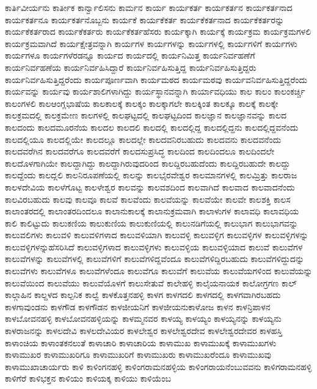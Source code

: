 {ಕಾರ್ತಿವೀರ್ಯನು
ಕಾರ್ತೀಕ
ಕಾರ್ನ್ವಾಲಿಸನು
ಕಾರ್ಮನ
ಕಾರ್ಯ
ಕಾರ್ಯಕರ್ತ
ಕಾರ್ಯಕರ್ತನ
ಕಾರ್ಯಕರ್ತನಾದ
ಕಾರ್ಯಕರ್ತನೂ
ಕಾರ್ಯಕರ್ತನೊಬ್ಬನು
ಕಾರ್ಯಕೆ
ಕಾರ್ಯಕೆಕರ್ತ
ಕಾರ್ಯಕೆಕರ್ತನಾದ
ಕಾರ್ಯಕೆಕರ್ತರನ್ನು
ಕಾರ್ಯಕೆಕರ್ತರಾದ
ಕಾರ್ಯಕೆಕರ್ತರು
ಕಾರ್ಯಕೆಕರ್ತಹೆಸರು
ಕಾರ್ಯಕ್ಕಾಗಿ
ಕಾರ್ಯಕ್ಕೆ
ಕಾರ್ಯಕ್ರಮ
ಕಾರ್ಯಕ್ರಮಗಳಲಿ
ಕಾರ್ಯಕ್ರಮವಾಗಿದೆ
ಕಾರ್ಯಕ್ಷೇತ್ರವನ್ನಾಗಿ
ಕಾರ್ಯಗಳ
ಕಾರ್ಯಗಳನ್ನು
ಕಾರ್ಯಗಳಲ್ಲಿ
ಕಾರ್ಯಗಳಿಗೆ
ಕಾರ್ಯಗಳು
ಕಾರ್ಯಗಳೂ
ಕಾರ್ಯಗಳೆರಡನ್ನೂ
ಕಾರ್ಯದ
ಕಾರ್ಯದಲ್ಲಿ
ಕಾರ್ಯನಿಮಿತ್ತ
ಕಾರ್ಯನಿರ್ವಹಣೆಗೆ
ಕಾರ್ಯನಿರ್ವಹಣೆಯ
ಕಾರ್ಯನಿರ್ವಹಿಸಿದ್ದಾರೆ
ಕಾರ್ಯನಿರ್ವಹಿಸುತ್ತಿದ್ದ
ಕಾರ್ಯನಿರ್ವಹಿಸುತ್ತಿದ್ದರು
ಕಾರ್ಯನಿರ್ವಹಿಸುತ್ತಿದ್ದರೆಂದು
ಕಾರ್ಯಪೂರ್ಣವಾಗಿ
ಕಾರ್ಯಮಠದ
ಕಾರ್ಯಮಠವು
ಕಾರ್ಯವನಿರ್ವಹಿಸುತ್ತಿದ್ದರೆಂದು
ಕಾರ್ಯವನ್ನು
ಕಾರ್ಯವು
ಕಾರ್ಯಶಾಲಿಗಳಾಗಿದ್ದು
ಕಾರ್ಯಸ್ಥಾನವನ್ನಾಗಿ
ಕಾರ್ಯಾವಧಿಯು
ಕಾಲ
ಕಾಲಂ
ಕಾಲಂಕರ್ಚ್ಚಿ
ಕಾಲಂಗಳಲಿ
ಕಾಲಆಂಗ್ಲಭಾಷೆಯ
ಕಾಲಕಾಲಕ್ಕೆ
ಕಾಲಕ್ಕಂ
ಕಾಲಕ್ಕಾಗಲೇ
ಕಾಲಕ್ಕಿಂತ
ಕಾಲಕ್ಕೂ
ಕಾಲಕ್ಕೆ
ಕಾಲಕ್ಕೇ
ಕಾಲಕ್ರಮದಲ್ಲಿ
ಕಾಲಕ್ರಮೇಣ
ಕಾಲಗಳಲ್ಲಿ
ಕಾಲಘಟ್ಟದಲ್ಲಿ
ಕಾಲಘಟ್ಟದಿಂದ
ಕಾಲಜ್ಞಾನ
ಕಾಲಜ್ಞಾನವನ್ನು
ಕಾಲದ
ಕಾಲದಂದು
ಕಾಲದಮೂರನೆಯ
ಕಾಲದಲ
ಕಾಲದಲಿ
ಕಾಲದಲ್ಲಿ
ಕಾಲದಲ್ಲಿದ್ದ
ಕಾಲದಲ್ಲಿದ್ದನು
ಕಾಲದಲ್ಲಿದ್ದವನೆಂದು
ಕಾಲದಲ್ಲಿಯೂ
ಕಾಲದಲ್ಲಿಯೇ
ಕಾಲದಲ್ಲೂ
ಕಾಲದಲ್ಲೇ
ಕಾಲದವನಿರಬಹುದು
ಕಾಲದವನು
ಕಾಲದವನೆಂದು
ಕಾಲದವರೆಗಿನ
ಕಾಲದವರೆಗೂ
ಕಾಲದವರೆಗೆ
ಕಾಲದಸುಪ್ರಸಿದ್ಧ
ಕಾಲದಿಂದ
ಕಾಲದಿಂದಲೂ
ಕಾಲದಿಂದಲೇ
ಕಾಲದೊಳಗಾಗಿಯೇ
ಕಾಲದ್ದಾಗಿದ್ದು
ಕಾಲದ್ದಾಗಿರುವುದರಿಂದ
ಕಾಲದ್ದಿರಬಹುದೆಂದು
ಕಾಲದ್ದಿರಬಹುದೇ
ಕಾಲದ್ದು
ಕಾಲದ್ದೆಂದು
ಕಾಲದ್ಲಲಿ
ಕಾಲನಿರೂಪಣೆಯಲ್ಲಿ
ಕಾಲನ್ನು
ಕಾಲಭೈರವೇಶ್ವರ
ಕಾಲಮಾನಗಳಲ್ಲಿ
ಕಾಲಮ್ರಿತ್ತು
ಕಾಲರಾಜ
ಕಾಲಳದೇವಿಯ
ಕಾಲಳೆಗೊಟ್ಟ
ಕಾಲಳೇಶ್ವರ
ಕಾಲವನ್ನು
ಕಾಲವಶದಿಂದ
ಕಾಲವಾಗಿದೆ
ಕಾಲವಾದ
ಕಾಲವಾದನೆಂದು
ಕಾಲವಿರಬಹುದು
ಕಾಲವು
ಕಾಲವೂ
ಕಾಲವೆ
ಕಾಲವೆಂದು
ಕಾಲವೆಯನ್ನು
ಕಾಲವೆಯೇ
ಕಾಲವೇ
ಕಾಲಶಕ್ತಿ
ಕಾಲಸ
ಕಾಲಾಂತರದಲ್ಲಿ
ಕಾಲಾಂತರದಿಂದಲೂ
ಕಾಲಾನುಕಾಲಕ್ಕೆ
ಕಾಲಾನುಕ್ರಮವಾಗಿ
ಕಾಲಾಳುಗಳ
ಕಾಲಾವಧಿ
ಕಾಲಾವಧಿಯ
ಕಾಲಿ
ಕಾಲಿಟ್ಟುದು
ಕಾಲುಕಣಿಯ
ಕಾಲುಕುಣಿಯ
ಕಾಲುಕುಣಿಯಲ್ಲಿ
ಕಾಲುನಡಿಗೆಯಲ್ಲಿ
ಕಾಲುಭಾಗ
ಕಾಲುಭಾಗವನ್ನು
ಕಾಲುವಲಿಗಳು
ಕಾಲುವಳಿ
ಕಾಲುವಳಿಗಳಾದ
ಕಾಲುವಳಿಯಾಗಿ
ಕಾಲುವಳ್ಳಿ
ಕಾಲುವಳ್ಳಿಗ
ಕಾಲುವಳ್ಳಿಗಳ
ಕಾಲುವಳ್ಳಿಗಳನ್ನು
ಕಾಲುವಳ್ಳಿಗಳನ್ನುಹೆಸರಿಸಿದೆ
ಕಾಲುವಳ್ಳಿಗಳಾದ
ಕಾಲುವಳ್ಳಿಗಳು
ಕಾಲುವಳ್ಳಿಯ
ಕಾಲುವಳ್ಳಿಯಾದ
ಕಾಲುವೆ
ಕಾಲುವೆಗಳ
ಕಾಲುವೆಗಳನ್ನು
ಕಾಲುವೆಗಳಲ್ಲಿ
ಕಾಲುವೆಗಳಿಗೆ
ಕಾಲುವೆಗಳಿದ್ದವೆಂದೂ
ಕಾಲುವೆಗಳಿದ್ದಿರಬಹುದು
ಕಾಲುವೆಗಳಿದ್ದುದನ್ನು
ಕಾಲುವೆಗಳು
ಕಾಲುವೆಗಳೂ
ಕಾಲುವೆಗಳೆಂದೂ
ಕಾಲುವೆಗೂ
ಕಾಲುವೆಗೆ
ಕಾಲುವೆಯ
ಕಾಲುವೆಯಗಳಿಂದ
ಕಾಲುವೆಯನ್ನು
ಕಾಲುವೆಯಿಂದ
ಕಾಲುವೆಯು
ಕಾಲುವೆಯೊಳಗೆ
ಕಾಲುಸೇತುವೆ
ಕಾಲೇಹಳ್ಳಿ
ಕಾಲೈಯನಾಯಕ
ಕಾಲೋಗ್ರಗಣ
ಕಾಲ್
ಕಾಲ್ಗಾಹಿನ
ಕಾಲ್ದಳದ
ಕಾಲ್ಪನಿಕ
ಕಾಲ್ವೆ
ಕಾಳಕೊತ್ತನಹಳ್ಳಿ
ಕಾಳಗ
ಕಾಳಗದಲಿ
ಕಾಳಗದಲ್ಲಿ
ಕಾಳಗವಾಗಿರಬಹದು
ಕಾಳಗಾವುಂಡನು
ಕಾಳಗೌಡ
ಕಾಳಗೌಡನ
ಕಾಳಜೀಯನಿಗೆ
ಕಾಳಜೀಯನುಕಾಳೋಜ
ಕಾಳನ
ಕಾಳನ್ರಿಪಾಳನ
ಕಾಳಬೋವನಹಳ್ಳಿ
ಕಾಳಬೋವನಹಳ್ಳಿಯನ್ನು
ಕಾಳಮ್ಮನವರ
ಕಾಳಯ್ಯ
ಕಾಳಯ್ಯಂ
ಕಾಳಯ್ಯನನ್ನು
ಕಾಳಯ್ಯನು
ಕಾಳರಾಜನನ್ನು
ಕಾಳಲದೇವಿ
ಕಾಳಲದೇವಿಯರ
ಕಾಳಲೇಶ್ವರ
ಕಾಳಲೇಶ್ವರದೇವ
ಕಾಳಲೇಶ್ವರದೇವರ
ಕಾಳಹಸ್ತಿ
ಕಾಳಾಂಚಿಯ
ಕಾಳಾಂತಕನಲುತೆ
ಕಾಳಾಚಾರಿ
ಕಾಳಾಚಾರಿಯ
ಕಾಳಾಮುಖ
ಕಾಳಾಮುಖಕ್ಕೆ
ಕಾಳಾಮುಖಗಳು
ಕಾಳಾಮುಖರ
ಕಾಳಾಮುಖರಿಗೂ
ಕಾಳಾಮುಖರಿಗೆ
ಕಾಳಾಮುಖರು
ಕಾಳಾಮುಖರೆಂದೂ
ಕಾಳಾಮುಖವು
ಕಾಳಾಮುಖಾಚಾರ್ಯರು
ಕಾಳಿ
ಕಾಳಿಂಗನಹಳ್ಳಿ
ಕಾಳಿಂಗರಾಮನಹಳ್ಳಿಯ
ಕಾಳಿಂಗರಾಯನೆಂಬುವವನು
ಕಾಳಿಗರಾಮನಹಳ್ಳಿ
ಕಾಳಿಗೆರೆ
ಕಾಳಿಭಕ್ತನ
ಕಾಳಿಯಂ
ಕಾಳಿಯಕ್ಕ
ಕಾಳಿಯು
ಕಾಳಿಯೆಂಬ
}

